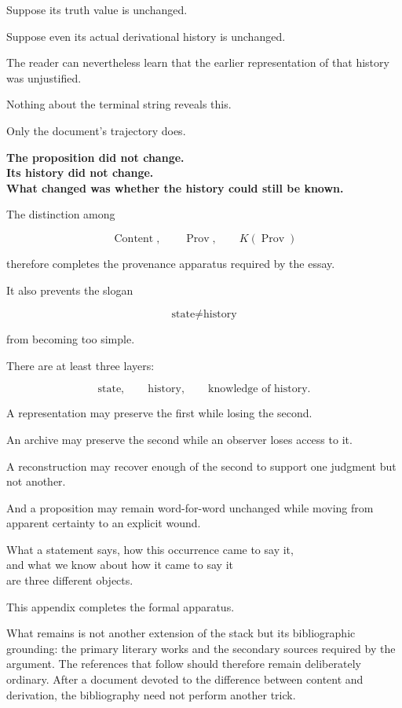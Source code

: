 \documentclass[
  11pt,
  a4paper,
  DIV=12,
  BCOR=0mm,
  parskip=half-
]{scrartcl}
\newcommand{\Prov}{\operatorname{Prov}}
\newcommand{\Content}{\operatorname{Content}}
\theoremstyle{definition}
\theoremstyle{plain}
\theoremstyle{remark}
\begin{document}
Suppose its truth value is unchanged.

Suppose even its actual derivational history is unchanged.

The reader can nevertheless learn that the earlier representation of that
history was unjustified.

Nothing about the terminal string reveals this.

Only the document's trajectory does.

\begin{woundbox}
\centering
{\color{woundred}\bfseries
The proposition did not change.\\[3pt]
Its history did not change.\\[3pt]
What changed was whether the history could still be known.}
\end{woundbox}

The distinction among

\[
  \Content,
  \qquad
  \Prov,
  \qquad
  K(\Prov)
\]

therefore completes the provenance apparatus required by the essay.

It also prevents the slogan

\[
  \text{state}\neq\text{history}
\]

from becoming too simple.

There are at least three layers:

\[
  \text{state},
  \qquad
  \text{history},
  \qquad
  \text{knowledge of history}.
\]

A representation may preserve the first while losing the second.

An archive may preserve the second while an observer loses access to it.

A reconstruction may recover enough of the second to support one judgment but
not another.

And a proposition may remain word-for-word unchanged while moving from
apparent certainty to an explicit wound.

\begin{held}
\centering
What a statement says, how this occurrence came to say it,\\
and what we know about how it came to say it\\
are three different objects.
\end{held}

This appendix completes the formal apparatus.

What remains is not another extension of the stack but its bibliographic
grounding: the primary literary works and the secondary sources required by
the argument. The references that follow should therefore remain deliberately
ordinary. After a document devoted to the difference between content and
derivation, the bibliography need not perform another trick.
\end{document}
